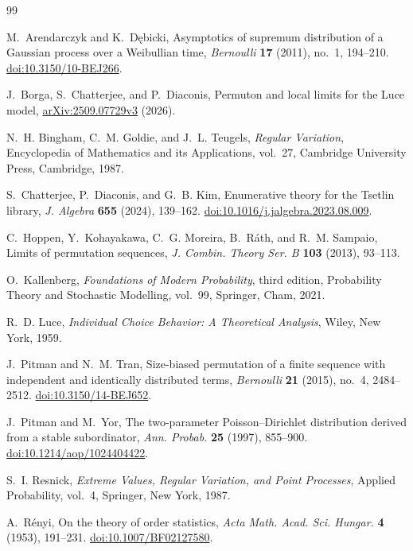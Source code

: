\documentclass[11pt]{article}
\numberwithin{equation}{section}
\theoremstyle{definition}
\theoremstyle{remark}
\begin{document}
\clearpage
\begin{thebibliography}{99}

M.~Arendarczyk and K.~D\k{e}bicki,
\newblock Asymptotics of supremum distribution of a Gaussian process over a Weibullian time,
\newblock \emph{Bernoulli} \textbf{17} (2011), no.~1, 194--210.
\newblock \href{https://doi.org/10.3150/10-BEJ266}
  {doi:10.3150/10-BEJ266}.

J.~Borga, S.~Chatterjee, and P.~Diaconis,
\newblock Permuton and local limits for the Luce model,
\newblock \href{https://arxiv.org/abs/2509.07729}{arXiv:2509.07729v3} (2026).

N.~H. Bingham, C.~M. Goldie, and J.~L. Teugels,
\newblock \emph{Regular Variation},
\newblock Encyclopedia of Mathematics and its Applications, vol.~27,
  Cambridge University Press, Cambridge, 1987.

S.~Chatterjee, P.~Diaconis, and G.~B. Kim,
\newblock Enumerative theory for the Tsetlin library,
\newblock \emph{J. Algebra} \textbf{655} (2024), 139--162.
\newblock \href{https://doi.org/10.1016/j.jalgebra.2023.08.009}
  {doi:10.1016/j.jalgebra.2023.08.009}.

C.~Hoppen, Y.~Kohayakawa, C.~G. Moreira, B.~R\'ath, and R.~M. Sampaio,
\newblock Limits of permutation sequences,
\newblock \emph{J. Combin. Theory Ser. B} \textbf{103} (2013), 93--113.

O.~Kallenberg,
\newblock \emph{Foundations of Modern Probability}, third edition,
\newblock Probability Theory and Stochastic Modelling, vol.~99,
  Springer, Cham, 2021.

R.~D. Luce,
\newblock \emph{Individual Choice Behavior: A Theoretical Analysis},
\newblock Wiley, New York, 1959.

J.~Pitman and N.~M. Tran,
\newblock Size-biased permutation of a finite sequence with independent and identically distributed terms,
\newblock \emph{Bernoulli} \textbf{21} (2015), no.~4, 2484--2512.
\newblock \href{https://doi.org/10.3150/14-BEJ652}
  {doi:10.3150/14-BEJ652}.

J.~Pitman and M.~Yor,
\newblock The two-parameter Poisson--Dirichlet distribution derived from a stable subordinator,
\newblock \emph{Ann. Probab.} \textbf{25} (1997), 855--900.
\newblock \href{https://doi.org/10.1214/aop/1024404422}
  {doi:10.1214/aop/1024404422}.


S.~I. Resnick,
\newblock \emph{Extreme Values, Regular Variation, and Point Processes},
\newblock Applied Probability, vol.~4, Springer, New York, 1987.

A.~R\'enyi,
\newblock On the theory of order statistics,
\newblock \emph{Acta Math. Acad. Sci. Hungar.} \textbf{4} (1953), 191--231.
\newblock \href{https://doi.org/10.1007/BF02127580}
  {doi:10.1007/BF02127580}.

\end{thebibliography}
\end{document}
